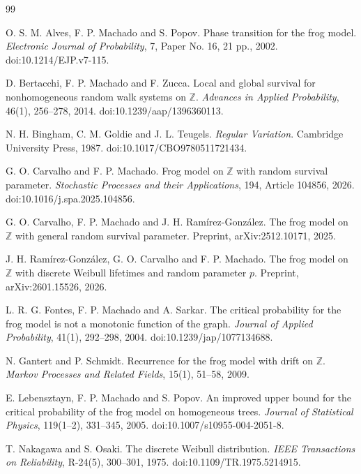 \documentclass[reqno,final,11pt]{amsart}
\theoremstyle{plain}
\theoremstyle{definition}
\theoremstyle{remark}
\numberwithin{equation}{section}
\begin{document}
\begin{thebibliography}{99}

O. S. M. Alves, F. P. Machado and S. Popov.
\newblock Phase transition for the frog model.
\newblock \emph{Electronic Journal of Probability}, 7, Paper No. 16, 21 pp., 2002.
\newblock doi:10.1214/EJP.v7-115.

D. Bertacchi, F. P. Machado and F. Zucca.
\newblock Local and global survival for nonhomogeneous random walk systems on \(\mathbb Z\).
\newblock \emph{Advances in Applied Probability}, 46(1), 256--278, 2014.
\newblock doi:10.1239/aap/1396360113.

N. H. Bingham, C. M. Goldie and J. L. Teugels.
\newblock \emph{Regular Variation}.
\newblock Cambridge University Press, 1987.
\newblock doi:10.1017/CBO9780511721434.

G. O. Carvalho and F. P. Machado.
\newblock Frog model on \(\mathbb Z\) with random survival parameter.
\newblock \emph{Stochastic Processes and their Applications}, 194, Article 104856, 2026.
\newblock doi:10.1016/j.spa.2025.104856.

G. O. Carvalho, F. P. Machado and J. H. Ram\'irez-Gonz\'alez.
\newblock The frog model on \(\mathbb Z\) with general random survival parameter.
\newblock Preprint, arXiv:2512.10171, 2025.

J. H. Ram\'irez-Gonz\'alez, G. O. Carvalho and F. P. Machado.
\newblock The frog model on \(\mathbb Z\) with discrete Weibull lifetimes and random parameter \(p\).
\newblock Preprint, arXiv:2601.15526, 2026.

L. R. G. Fontes, F. P. Machado and A. Sarkar.
\newblock The critical probability for the frog model is not a monotonic function of the graph.
\newblock \emph{Journal of Applied Probability}, 41(1), 292--298, 2004.
\newblock doi:10.1239/jap/1077134688.

N. Gantert and P. Schmidt.
\newblock Recurrence for the frog model with drift on \(\mathbb Z\).
\newblock \emph{Markov Processes and Related Fields}, 15(1), 51--58, 2009.

E. Lebensztayn, F. P. Machado and S. Popov.
\newblock An improved upper bound for the critical probability of the frog model on homogeneous trees.
\newblock \emph{Journal of Statistical Physics}, 119(1--2), 331--345, 2005.
\newblock doi:10.1007/s10955-004-2051-8.

T. Nakagawa and S. Osaki.
\newblock The discrete Weibull distribution.
\newblock \emph{IEEE Transactions on Reliability}, R-24(5), 300--301, 1975.
\newblock doi:10.1109/TR.1975.5214915.

\end{thebibliography}
\end{document}
